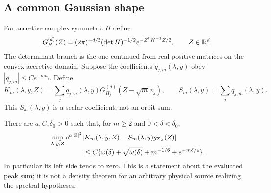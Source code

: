 \subsection{A common Gaussian shape}
For accretive complex symmetric $H$ define
\[
 G_H^{(d)}(Z)=(2\pi)^{-d/2}(\det H)^{-1/2}
                         e^{-Z^{\mathsf T}H^{-1}Z/2},
                    \qquad Z\in\mathbb R^d.
\]
The determinant branch is the one continued from real positive
matrices on the convex accretive domain. Suppose the coefficients
$q_{j,m}(\lambda,y)$ obey
$|q_{j,m}|\le C e^{-m\kappa_j}$. Define
\[
 K_m(\lambda,y,Z)=\sum_jq_{j,m}(\lambda,y)
                         G_{H_j}^{(d)}(Z-\sqrt m\,v_j),\qquad
 S_m(\lambda,y)=\sum_jq_{j,m}(\lambda,y).
\]
This $S_m(\lambda,y)$ is a scalar coefficient, not an orbit sum.

\begin{corollary}
\label{cor:v58-common-shape}
There are $a,C,\delta_0>0$ such that, for $m\ge2$ and
$0<\delta<\delta_0$,
\begin{align}
 &\sup_{\lambda,y,Z}e^{a|Z|^2}
 |K_m(\lambda,y,Z)-S_m(\lambda,y)g_{\Sigma_\lambda}(Z)|
 \notag\\[-1mm]
 &\hspace{17mm}\le
 C\{\omega(\delta)+\sqrt{\omega(\delta)}
                    +m^{-1/6}+e^{-m\delta/4}\}.
                                      \label{eq:v58-shape-modulus}
\end{align}
In particular its left side tends to zero. This is a statement about
the evaluated peak sum; it is not a density theorem for an arbitrary
physical source realizing the spectral hypotheses.
\end{corollary}
